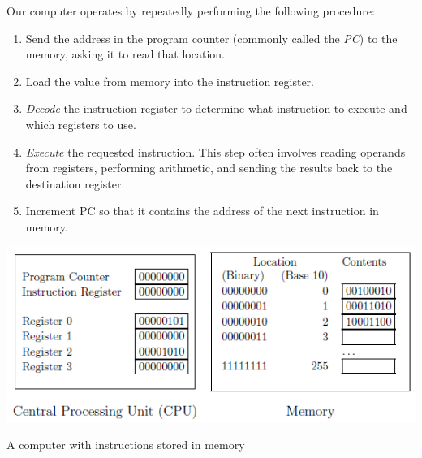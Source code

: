 \documentclass[8pt,a4paper,compress,handout]{beamer}
\begin{document}
\begin{frame}[fragile]
Our computer operates by repeatedly performing the following procedure:
\begin{enumerate}
\item Send the address in the program counter (commonly called the \emph{PC}) to the memory, asking it to read that location.

\item Load the value from memory into the instruction register.

\item \emph{Decode} the instruction register to determine what instruction to execute and which registers to use.

\item \emph{Execute} the requested instruction. This step often involves reading operands from registers, performing arithmetic, and sending the results back to the destination register. 

\item Increment PC so that it contains the address of the next instruction in memory.
\end{enumerate}
\begin{center}
\includegraphics[scale=0.35]{figures/von_neumann_arch.png}

\smallskip

\tiny A computer with instructions stored in memory
\end{center}

\end{frame}
\end{document}
